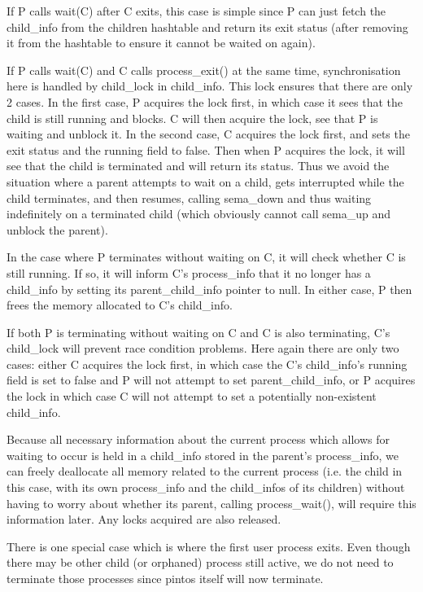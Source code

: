 If P calls wait(C) after C exits, this case is simple since P can just fetch the child\_info from the children hashtable and return its exit status (after removing it from the hashtable to ensure it cannot be waited on again).

If P calls wait(C) and C calls process\_exit() at the same time, synchronisation here is handled by child\_lock in child\_info. This lock ensures that there are only 2 cases. In the first case, P acquires the lock first, in which case it sees that the child is still running and blocks. C will then acquire the lock, see that P is waiting and unblock it. In the second case, C acquires the lock first, and sets the exit status and the running field to false. Then when P acquires the lock, it will see that the child is terminated and will return its status. Thus we avoid the situation where a parent attempts to wait on a child, gets interrupted while the child terminates, and then resumes, calling sema\_down and thus waiting indefinitely on a terminated child (which obviously cannot call sema\_up and unblock the parent).

In the case where P terminates without waiting on C, it will check whether C is still running. If so, it will inform C's process\_info that it no longer has a child\_info by setting its parent\_child\_info pointer to null. In either case, P then frees the memory allocated to C's child\_info.

If both P is terminating without waiting on C and C is also terminating, C's child\_lock will prevent race condition problems. Here again there are only two cases: either C acquires the lock first, in which case the C's child\_info's running field is set to false and P will not attempt to set parent\_child\_info, or P acquires the lock in which case C will not attempt to set a potentially non-existent child\_info.

Because all necessary information about the current process which allows for waiting to occur is held in a child\_info stored in the parent's process\_info, we can freely deallocate all memory related to the current process (i.e. the child in this case, with its own process\_info and the child\_infos of its children) without having to worry about whether its parent, calling process\_wait(), will require this information later. Any locks acquired are also released.

There is one special case which is where the first user process exits. Even though there may be other child (or orphaned) process still active, we do not need to terminate those processes since pintos itself will now terminate.

